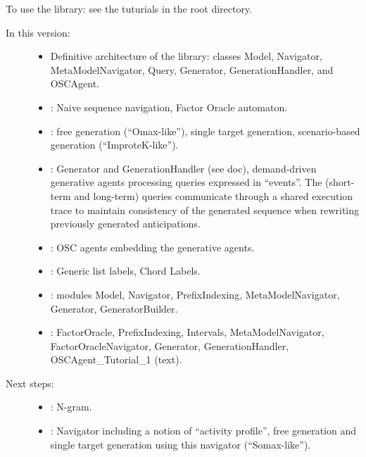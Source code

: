 \documentclass[letterpaper,10pt,english]{sphinxmanual}
\begin{document}
To use the library: see the tuturials in the root directory.
\begin{description}
\item[{In this version:}] \leavevmode\begin{itemize}
\item {} 
Definitive architecture of the library: classes Model, Navigator, MetaModelNavigator, Query, Generator, GenerationHandler, and OSCAgent.

\item {} 
: Naive sequence navigation, Factor Oracle automaton.

\item {} 
: free generation (“Omax-like”), single target generation, scenario-based generation (“ImproteK-like”).

\item {} 
: Generator and GenerationHandler (see doc), demand-driven generative agents processing queries expressed in “events”. The (short-term and long-term) queries communicate through a shared execution trace to maintain consistency of the generated sequence when rewriting previously generated anticipations.

\item {} 
: OSC agents embedding the generative agents.

\item {} 
: Generic list labels, Chord Labels.

\item {} 
: modules Model, Navigator, PrefixIndexing, MetaModelNavigator, Generator, GeneratorBuilder.

\item {} 
: FactorOracle, PrefixIndexing, Intervals, MetaModelNavigator, FactorOracleNavigator, Generator, GenerationHandler, OSCAgent\_Tutorial\_1 (text).

\end{itemize}

\item[{Next steps:}] \leavevmode\begin{itemize}
\item {} 
: N-gram.

\item {} 
: Navigator including a notion of “activity profile”, free generation and single target generation using this navigator  (“Somax-like”).


\end{itemize}
\end{description}
\end{document}
